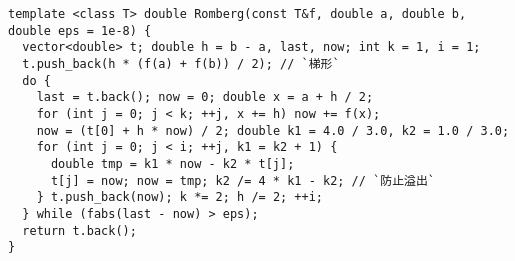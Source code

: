 \begin{lstlisting}
template <class T> double Romberg(const T&f, double a, double b, double eps = 1e-8) {
  vector<double> t; double h = b - a, last, now; int k = 1, i = 1;
  t.push_back(h * (f(a) + f(b)) / 2); // `梯形`
  do {
    last = t.back(); now = 0; double x = a + h / 2;
    for (int j = 0; j < k; ++j, x += h) now += f(x);
    now = (t[0] + h * now) / 2; double k1 = 4.0 / 3.0, k2 = 1.0 / 3.0;
    for (int j = 0; j < i; ++j, k1 = k2 + 1) {
      double tmp = k1 * now - k2 * t[j];
      t[j] = now; now = tmp; k2 /= 4 * k1 - k2; // `防止溢出`
    } t.push_back(now); k *= 2; h /= 2; ++i;
  } while (fabs(last - now) > eps);
  return t.back();
}
\end{lstlisting}